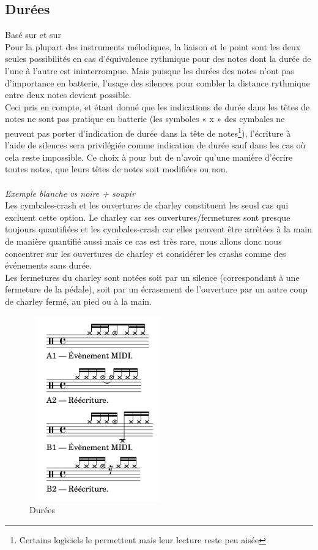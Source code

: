 \subsection*{Durées}
Basé sur \cite{jacquemard:hal-01134096} et sur \cite{jacquemard:hal-01403982}\\
Pour la plupart des instruments mélodiques, la liaison et le point sont les deux seules possibilités en cas d’équivalence rythmique pour des notes dont la durée de l’une à l’autre est ininterrompue. Mais puisque les durées des notes n’ont pas d’importance en batterie, l’usage des silences pour combler la distance rythmique entre deux notes devient possible.\\
Ceci pris en compte, et étant donné que les indications de durée dans les têtes de notes ne sont pas pratique en batterie (les symboles « x » des cymbales ne
peuvent pas porter d’indication de durée dans la tête de notes\footnote{Certains logiciels le permettent mais leur lecture reste peu aisée}), l’écriture à l’aide de silences sera privilégiée comme indication de durée sauf dans les cas où cela reste impossible. Ce choix à pour but de n’avoir qu’une manière d’écrire toutes notes, que leurs têtes de notes soit modifiées ou non.\\\\
\textit{Exemple blanche vs noire + soupir}\\

Les cymbales-crash et les ouvertures de charley constituent les seusl cas qui excluent cette option. Le charley car ses ouvertures/fermetures sont presque toujours quantifiées et les cymbales-crash car elles peuvent être arrêtées à la main de manière quantifié aussi mais ce cas est très rare, nous allons donc nous concentrer sur les ouvertures de charley et considérer les crashs comme des événements sans durée.\\
Les fermetures du charley sont notées soit par un silence (correspondant à une fermeture de la pédale), soit par un écrasement de l’ouverture par un autre coup de charley fermé, au pied ou à la main.
\begin{figure}[!h]
	\centering
	\includegraphics[height=80mm, width=60mm]{z_images/reecriture/exemples_charley_1.png}
	\caption{Durées}
	\label{duree_hh}
\end{figure}\newpage
